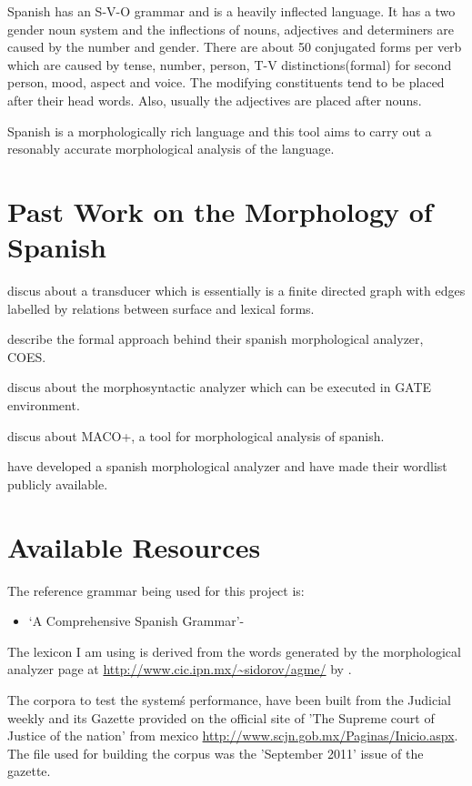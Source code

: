 \documentclass[11pt,letterpaper]{article}
\begin{document}
Spanish has an S-V-O grammar and is a heavily inflected language. It has a two gender noun system and the inflections of nouns, adjectives and determiners are caused by the number and gender. There are about 50 conjugated forms per verb which are caused by tense, number, person, T-V distinctions(formal) for second person, mood, aspect and voice. The modifying constituents tend to be placed after their head words. Also, usually the adjectives are placed after nouns.

Spanish is a morphologically rich language and this tool aims to carry out a resonably accurate morphological analysis of the language. 

 

\section{Past Work on the Morphology of Spanish}

\cite{tzoukermann1990finite} discus about a transducer which is essentially is a finite directed graph with edges labelled by relations between surface and lexical forms. 

\cite{rodriguez1996formal} describe the formal approach behind their spanish morphological analyzer, COES. 

\cite{atserias1998morphosyntactic} discus about the morphosyntactic analyzer which can be executed in GATE environment.

\cite{carmona1998environment} discus about MACO+, a tool for morphological analysis of spanish.

\cite{gelbukh2003approach} have developed a spanish morphological analyzer and have made their wordlist publicly available.

\section{Available Resources}

The reference grammar being used for this project is:
\begin{itemize}
\item
`A Comprehensive Spanish Grammar'- \cite{bruyne1995comprehensive}
\end{itemize}
The lexicon I am using is derived from the words generated by the morphological analyzer page at \url{http://www.cic.ipn.mx/~sidorov/agme/} by \cite{gelbukh2003approach}.

The corpora to test the systemś performance, have been built from the Judicial weekly and its Gazette provided on the official site of 'The Supreme court of Justice of the nation' from mexico \url{http://www.scjn.gob.mx/Paginas/Inicio.aspx}. The file used for building the corpus was the 'September 2011' issue of the gazette.
\end{document}
